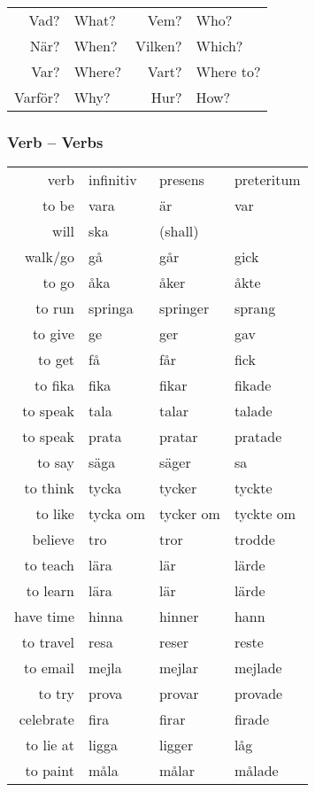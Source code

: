 \documentclass[14pt]{refcard} %
\begin{document}
\begin{tabular}{rl rl}

Vad?       & What?     & Vem?       & Who?      \\
När?       & When?     & Vilken?    & Which?    \\
Var?       & Where?    & Vart?      & Where to? \\
Varför?    & Why?      & Hur?       & How?      \\
\end{tabular}


\subsubsection{Verb -- Verbs}

\begin{tabular}{@{}rlll}
verb      & infinitiv & presens   & preteritum \\[1ex]
to be     & vara      & är        & var        \\
will      & ska       & (shall)   &            \\[1ex]
walk/go   & gå        & går       & gick       \\
to go     & åka       & åker      & åkte       \\
to run    & springa   & springer  & sprang     \\[1ex]
to give   & ge        & ger       & gav        \\
to get    & få        & får       & fick       \\[1ex]
to fika   & fika      & fikar     & fikade     \\[1ex]
to speak  & tala      & talar     & talade     \\
to speak  & prata     & pratar    & pratade    \\
to say    & säga      & säger     & sa         \\[1ex]
to think  & tycka     & tycker    & tyckte     \\
to like   & \footnotesize tycka om  & \footnotesize tycker om & \footnotesize tyckte om  \\
believe   & tro       & tror      & trodde     \\[1ex]
to teach  & lära      & lär       & lärde      \\
to learn  & lära      & lär       & lärde      \\[1ex]
have time & hinna     & hinner    & hann       \\[1ex]
to travel & resa      & reser     & reste      \\
to email  & mejla     & mejlar    & mejlade    \\
to try    & prova     & provar    & provade    \\
celebrate & fira      & firar     & firade     \\
to lie at & ligga     & ligger    & låg        \\
to paint  & måla      & målar     & målade     \\
\end{tabular}
\end{document}
